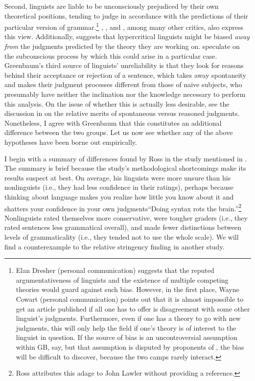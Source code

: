 Second, linguists are liable to be unconsciously prejudiced by their own theoretical positions, tending to judge in accordance with the predictions of their particular version of grammar.\footnote{Elan Dresher (personal communication) suggests that the reputed argumentativeness of linguists and the existence of multiple competing theories would guard against such bias. However, in the first place, Wayne Cowart (personal communication) points out that it is almost impossible to get 
an article published if all one has to offer is disagreement with some other linguist's judgments. Furthermore, even if one has a theory to go with new judgments, this will only help the field if one's theory is of interest to the linguist in question. If the source of bias is an uncontroversial assumption within GB, say, but that assumption is disputed by proponents of , the bias will be difficult to discover, because the two camps rarely interact.}
 \citet{Botha1973}, \citet{Derwing1973}, \citet{Sampson1975}
 and \citet{Ringen1979}, among many other
critics, also express this view. Additionally, \citet{Levelt1974} suggests that hypercritical linguists might be biased \textit{away from} the judgments predicted by the theory they are working on. \citet{CardenEtAl1981} speculate on the subconscious process by which this could arise in a particular case. Greenbaum's third source of linguists' unreliability is that they look for reasons behind their acceptance or rejection of a sentence, which takes away spontaneity and makes their judgment processes different from those of naive subjects, who presumably have neither the inclination nor the knowledge necessary to perform this analysis. On the issue of whether this is actually less desirable, see the discussion in  on the
relative merits of spontaneous versus reasoned judgments. Nonetheless, I agree with Greenbaum that this constitutes an additional difference between the two groups. Let us now see whether any of the above hypotheses have been borne out empirically.

I begin with a summary of differences found by Ross in the study mentioned in . The summary is brief because the study's methodological shortcomings make its results suspect at best. On average, his linguists were more unsure than his nonlinguists (i.e., they had less confidence in their ratings), perhaps because thinking about language makes you realize how little you know about it and shatters your confidence in your own judgments\schdash{}``Doing syntax rots the brain.''\footnote{Ross attributes this adage to John Lawler without providing a reference.}
 Nonlinguists rated themselves more conservative, were tougher graders (i.e., they rated sentences less grammatical overall), and made fewer distinctions between levels of grammaticality (i.e., they tended not to use the whole scale). We will find a counterexample to the relative stringency finding in another study.

